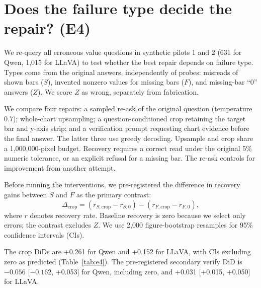 
\section{Does the failure type decide the repair? (E4)}
\label{sec:e4}

We re-query all erroneous value questions in synthetic pilots 1 and 2 (631
for Qwen, 1,015 for LLaVA) to test whether the best repair depends on failure
type. Types come from the original answers, independently of probes: misreads
of shown bars ($S$), invented nonzero values for missing bars ($F$), and
missing-bar ``0'' answers ($Z$). We score $Z$ as wrong, separately from
fabrication.

We compare four repairs: a sampled re-ask of the original question
(temperature 0.7); whole-chart upsampling; a question-conditioned crop retaining
the target bar and y-axis strip; and a verification prompt requesting chart
evidence before the final answer. The latter three use greedy decoding.
Upsample and crop share a 1,000,000-pixel budget. Recovery requires a correct
read under the original 5\% numeric tolerance, or an explicit refusal for a
missing bar. The re-ask controls for improvement from another attempt.

Before running the interventions, we pre-registered the difference in recovery
gains between $S$ and $F$ as the primary contrast:
\begin{equation}
\Delta_{\mathrm{crop}}=
 (r_{S,\mathrm{crop}}-r_{S,0})-(r_{F,\mathrm{crop}}-r_{F,0}),
\end{equation}
where $r$ denotes recovery rate. Baseline recovery is zero because we select
only errors; the contrast excludes $Z$. We use 2,000 figure-bootstrap
resamples for 95\% confidence intervals (CIs).



The crop DiDs are +0.261 for Qwen and +0.152 for LLaVA, with CIs excluding
zero as predicted (Table~\ref{tab:e4}). The pre-registered secondary verify
DiD is $-0.056$ [$-0.162$, +0.053] for Qwen, including zero, and +0.031
[+0.015, +0.050] for LLaVA.

